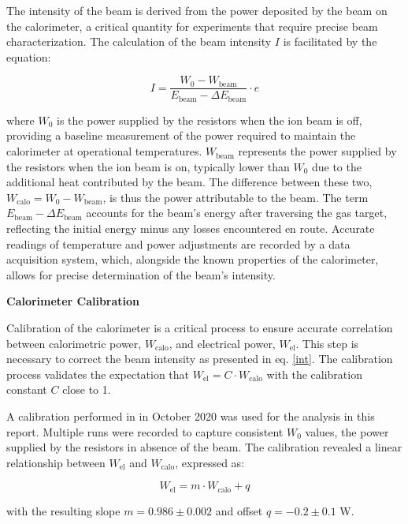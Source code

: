 \documentclass[a4paper,12pt]{article}
\begin{document}
The intensity of the beam is derived from the power deposited by the beam on the calorimeter, a critical quantity for experiments that require precise beam characterization. The calculation of the beam intensity \( I \) is facilitated by the equation:

\begin{equation}\label{int}
I = \frac{W_0 - W_{\text{beam}}}{E_{\text{beam}} - \Delta E_{\text{beam}}} \cdot e
\end{equation}

where \( W_0 \) is the power supplied by the resistors when the ion beam is off, providing a baseline measurement of the power required to maintain the calorimeter at operational temperatures. \( W_{\text{beam}} \) represents the power supplied by the resistors when the ion beam is on, typically lower than \( W_0 \) due to the additional heat contributed by the beam. The difference between these two, \( W_{\text{calo}} = W_0 - W_{\text{beam}} \), is thus the power attributable to the beam. The term \( E_{\text{beam}} - \Delta E_{\text{beam}} \) accounts for the beam's energy after traversing the gas target, reflecting the initial energy minus any losses encountered en route. Accurate readings of temperature and power adjustments are recorded by a data acquisition system, which, alongside the known properties of the calorimeter, allows for precise determination of the beam's intensity.

\textbf{Calorimeter Calibration}

Calibration of the calorimeter is a critical process to ensure accurate correlation between calorimetric power, \(W_{\text{calo}}\), and electrical power, \(W_{\text{el}}\). This step is necessary to correct the beam intensity as presented in eq. \ref{int}. The calibration process validates the expectation that \(W_{\text{el}} = C \cdot W_{\text{calo}}\) with the calibration constant \(C\) close to 1.

A calibration performed in \cite{masha2021} in October 2020 was used for the analysis in this report. Multiple runs were recorded to capture consistent \(W_0\) values, the power supplied by the resistors in absence of the beam. The calibration revealed a linear relationship between \(W_{\text{el}}\) and \(W_{\text{calo}}\), expressed as:

\begin{equation}
W_{\text{el}} = m \cdot W_{\text{calo}} + q
\end{equation}

with the resulting slope \(m = 0.986 \pm 0.002\) and offset \(q = -0.2 \pm 0.1\) W.
\end{document}
